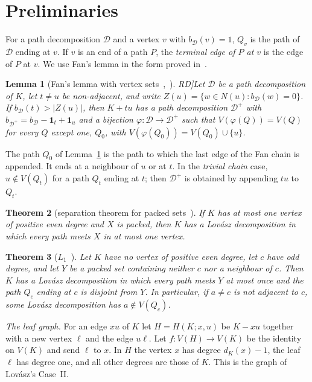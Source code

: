 \documentclass[11pt]{amsart}
\newtheorem{theorem}{Theorem}
\newtheorem{lemma}[theorem]{Lemma}
\theoremstyle{definition}
\newcommand{\cD}{\mathcal D}
\begin{document}
\section{Preliminaries}\label{sec:prelim}

For a path decomposition $\cD$ and a vertex $v$ with $b_\cD(v)=1$, $Q_v$ is the path of $\cD$ ending at
$v$. If $v$ is an end of a path $P$, the \emph{terminal edge of $P$ at $v$} is the edge of $P$ at $v$.
We use Fan's lemma in the form proved in~\cite[Lemma~2.2]{RD}.

\begin{lemma}[Fan's lemma with vertex sets~\cite{Fan05},~\cite[Lemma~2.2]{RD}]\label{lem:fan}
Let $\cD$ be a path decomposition of $K$, let $t\ne u$ be non-adjacent, and write
$Z(u)=\{w\in N(u): b_\cD(w)=0\}$. If $b_\cD(t)>|Z(u)|$, then $K+tu$ has a path decomposition $\cD^+$
with $b_{\cD^+}=b_\cD-\mathbf 1_t+\mathbf 1_u$ and a bijection $\varphi:\cD\to\cD^+$ such that
$V(\varphi(Q))=V(Q)$ for every $Q$ except one, $Q_0$, with $V(\varphi(Q_0))=V(Q_0)\cup\{u\}$.
\end{lemma}

The path $Q_0$ of Lemma~\ref{lem:fan} is the path to which the last edge of the Fan chain is appended.
It ends at a neighbour of $u$ or at $t$. In the \emph{trivial chain} case, $u\notin V(Q_t)$ for a path
$Q_t$ ending at $t$; then $\cD^+$ is obtained by appending $tu$ to $Q_t$.

\begin{theorem}[separation theorem for packed sets~{\cite[Theorem~6.1]{RD}}]\label{thm:sep}
If $K$ has at most one vertex of positive even degree and $X$ is packed, then $K$ has a Lov\'asz
decomposition in which every path meets $X$ in at most one vertex.
\end{theorem}

\begin{theorem}[$L_1$~{\cite[Theorem~6.3]{RD}}]\label{thm:L1}
Let $K$ have no vertex of positive even degree, let $c$ have odd degree, and let $Y$ be a packed set
containing neither $c$ nor a neighbour of $c$. Then $K$ has a Lov\'asz decomposition in which every path
meets $Y$ at most once and the path $Q_c$ ending at $c$ is disjoint from $Y$. In particular, if $a\ne c$ is
not adjacent to $c$, some Lov\'asz decomposition has $a\notin V(Q_c)$.
\end{theorem}

\emph{The leaf graph.} For an edge $xu$ of $K$ let $H=H(K;x,u)$ be $K-xu$ together with a new vertex
$\ell$ and the edge $u\ell$. Let $f:V(H)\to V(K)$ be the identity on $V(K)$ and send $\ell$ to $x$. In
$H$ the vertex $x$ has degree $d_K(x)-1$, the leaf $\ell$ has degree one, and all other degrees are
those of $K$. This is the graph of Lov\'asz's Case~II.
\end{document}
